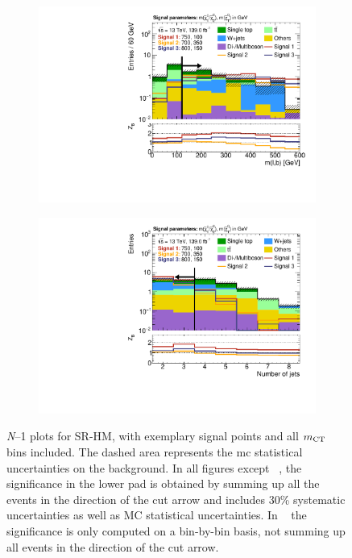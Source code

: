 \begin{figure}
\begin{subfigure}[b]{0.45\linewidth}
		\centering\includegraphics[width=\textwidth]{n1_SRHM_mct_bins/mlb1.pdf}
		\vspace{-2em}
		\caption{\label{fig:Wh_reopt_second_round_n1_srhm_mlb1}}
	\end{subfigure}%
	\begin{subfigure}[b]{0.45\linewidth}
		\centering\includegraphics[width=\textwidth]{n1_SRHM_mct_bins/nJet30.pdf}
		\vspace{-2em}
		\caption{\label{fig:Wh_reopt_second_round_n1_srhm_njet}}
	\end{subfigure}
	\caption{\textit{N}--1 plots for SR-HM, with exemplary signal points and all $m_{\textrm{CT}}$ bins included. The dashed area represents the \gls{mc} statistical uncertainties on the background. In all figures except \figname~, the significance in the lower pad is obtained by summing up all the events in the direction of the cut arrow and includes 30\% systematic uncertainties as well as MC statistical uncertainties. In \figname~ the significance is only computed on a bin-by-bin basis, \ie not summing up all events in the direction of the cut arrow.}
	\label{fig:Wh_reopt_second_round_n1_srhm}
\end{figure}




